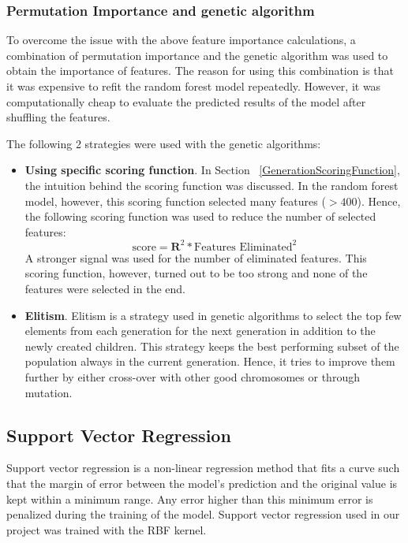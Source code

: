 \documentclass[11pt]{article}
\begin{document}
\subsubsection{Permutation Importance and genetic algorithm}
To overcome the issue with the above feature importance calculations, a combination of permutation importance and the genetic algorithm was used to obtain the importance of features.
The reason for using this combination is that it was expensive to refit the random forest model repeatedly. However, it was computationally cheap to evaluate the predicted results of the model after shuffling the features.

The following 2 strategies were used with the genetic algorithms:
\begin{itemize}
\item \textbf{Using specific scoring function}.  In Section ~\ref{GenerationScoringFunction},  the intuition behind the scoring function was discussed.
In the random forest model,  however,  this scoring function selected many features ($> 400$). Hence, the following scoring function was used to reduce the number of selected features:
$$
\textrm{score} = \mathbf{R}^2 * \textrm{Features Eliminated}^2
$$
A stronger signal was used for the number of eliminated features. This scoring function, however,  turned out to be too strong and none of the features were selected in the end.
\item \textbf{Elitism}.  Elitism is a strategy used in genetic algorithms to select the top few elements from each generation for the next generation in addition to the newly created children. This strategy keeps the best performing subset of the population always in the current generation. Hence, it tries to improve them further by either cross-over with other good chromosomes or through mutation.
\end{itemize}


\subsection{Support Vector Regression}
Support vector regression is a non-linear regression method that fits a curve such that the margin of error between the model's prediction and the original value is kept within a minimum range.
Any error higher than this minimum error is penalized during the training of the model.
Support vector regression used in our project was trained with the RBF kernel.
\end{document}
